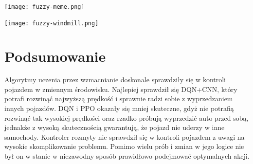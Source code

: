 \documentclass{article}
\begin{document}
\texttt{[image: fuzzy-meme.png]}

\texttt{[image: fuzzy-windmill.png]}

\newpage

\section{Podsumowanie}
\paragraph{}
Algorytmy uczenia przez wzmacnianie doskonale sprawdziły się w kontroli pojazdem w zmiennym środowisku. Najlepiej sprawdził się DQN+CNN, który potrafi rozwinąć najwyższą prędkość i sprawnie radzi sobie z wyprzedzaniem innych pojazdów. DQN i PPO okazały się mniej skuteczne, gdyż nie potrafią rozwinąć tak wysokiej prędkości oraz rzadko próbują wyprzedzić auto przed sobą, jednakże z wysoką skutecznością gwarantują, że pojazd nie uderzy w inne samochody. Kontroler rozmyty nie sprawdził się w kontroli pojazdem z uwagi na wysokie skomplikowanie problemu. Pomimo wielu prób i zmian w jego logice nie był on w stanie w niezawodny sposób prawidłowo podejmować optymalnych akcji.
\end{document}
